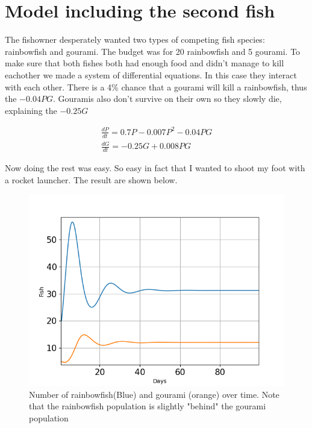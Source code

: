 \section{Model including the second fish}

\begin{flushleft}
    The fishowner desperately wanted two types of competing fish species:
    rainbowfish and gourami. The budget was for 20 rainbowfish and 5 gourami.
    To make sure that both fishes both had enough food and didn't manage to kill eachother
    we made a system of differential equations. In this case they interact with each other.
    There is a 4\% chance that a gourami will kill a rainbowfish, thus the $-0.04PG$.
    Gouramis also don't survive on their own so they slowly die, explaining the $-0.25G$
\end{flushleft}

\begin{align*}[left = \empheqlbrace]
    \frac{dP}{dt}= 0.7P-0.007P^2-0.04PG \\
    \frac{dG}{dt} = -0.25G+0.008PG
\end{align*}

\begin{flushleft}
    Now doing the rest was easy. So easy in fact that I wanted to shoot my foot
    with a rocket launcher. The result are shown below.

\end{flushleft}
\begin{figure}[H]
    \includegraphics[scale=0.4]{../figures/Figure_2.png}
    \centering
    \caption{Number of rainbowfish(Blue) and gourami (orange) over time. Note that the
        rainbowfish population is slightly "behind" the gourami population}
    \label{two}
\end{figure}

